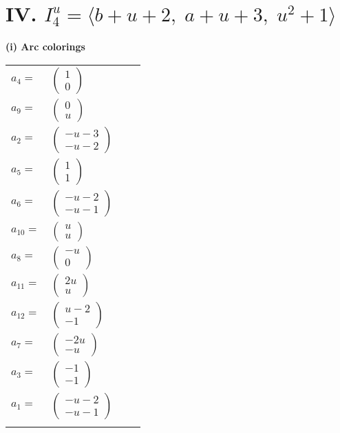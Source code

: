 \documentclass[1p]{elsarticle_modified}
\theoremstyle{definition}
\begin{document}
\centering \section*{IV. $I^u_{4}= \langle b+u+2,\;a+u+3,\;u^2+1 \rangle$}
\flushleft \textbf{(i) Arc colorings}\\
\begin{tabular}{m{7pt} m{180pt} m{7pt} m{180pt} }
\flushright $a_{4}=$&$\begin{pmatrix}1\\0\end{pmatrix}$ \\
\flushright $a_{9}=$&$\begin{pmatrix}0\\u\end{pmatrix}$ \\
\flushright $a_{2}=$&$\begin{pmatrix}- u-3\\- u-2\end{pmatrix}$ \\
\flushright $a_{5}=$&$\begin{pmatrix}1\\1\end{pmatrix}$ \\
\flushright $a_{6}=$&$\begin{pmatrix}- u-2\\- u-1\end{pmatrix}$ \\
\flushright $a_{10}=$&$\begin{pmatrix}u\\u\end{pmatrix}$ \\
\flushright $a_{8}=$&$\begin{pmatrix}- u\\0\end{pmatrix}$ \\
\flushright $a_{11}=$&$\begin{pmatrix}2 u\\u\end{pmatrix}$ \\
\flushright $a_{12}=$&$\begin{pmatrix}u-2\\-1\end{pmatrix}$ \\
\flushright $a_{7}=$&$\begin{pmatrix}-2 u\\- u\end{pmatrix}$ \\
\flushright $a_{3}=$&$\begin{pmatrix}-1\\-1\end{pmatrix}$ \\
\flushright $a_{1}=$&$\begin{pmatrix}- u-2\\- u-1\end{pmatrix}$\\&\end{tabular}
\end{document}
